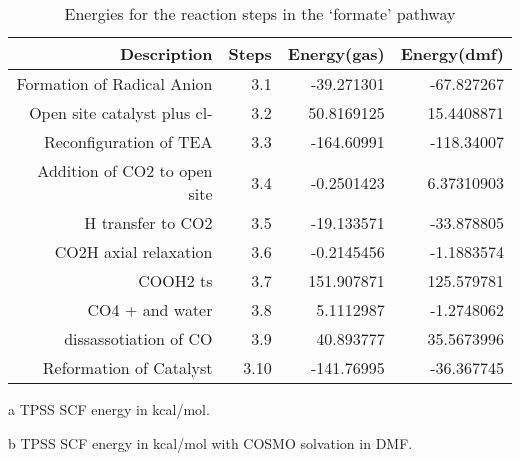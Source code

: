 \begin{table}[!htb]
\centering
 \begin{threeparttable}
  \caption{Energies for the reaction steps in the `formate' pathway}
    \begin{tabular}{rrrr}
    \toprule
    Description & Steps & Energy(gas)\tnote{a} & Energy(dmf)\tnote{b} \\
    \midrule
    Formation of Radical Anion & 3.1   & -39.271301 & -67.827267 \\
    Open site catalyst plus cl- & 3.2   & 50.8169125 & 15.4408871 \\
    Reconfiguration of TEA & 3.3   & -164.60991 & -118.34007 \\
    \midrule
    Addition of CO2 to open site & 3.4   & -0.2501423 & 6.37310903 \\
    H transfer to CO2 & 3.5   & -19.133571 & -33.878805 \\
    CO2H axial relaxation & 3.6   & -0.2145456 & -1.1883574 \\
    COOH2 ts & 3.7   & 151.907871 & 125.579781 \\
    CO4 + and water & 3.8   & 5.1112987 & -1.2748062 \\
    dissassotiation of CO & 3.9   & 40.893777 & 35.5673996 \\
    Reformation of Catalyst & 3.10  & -141.76995 & -36.367745 \\
    \bottomrule
    \end{tabular}%
    \begin{tablenotes}
    \item [a] TPSS SCF energy in kcal/mol.
    \item [b] TPSS SCF energy in kcal/mol with COSMO solvation in DMF.
    \end{tablenotes}
  \label{tab.siderxn}%
 \end{threeparttable}
\end{table}%


